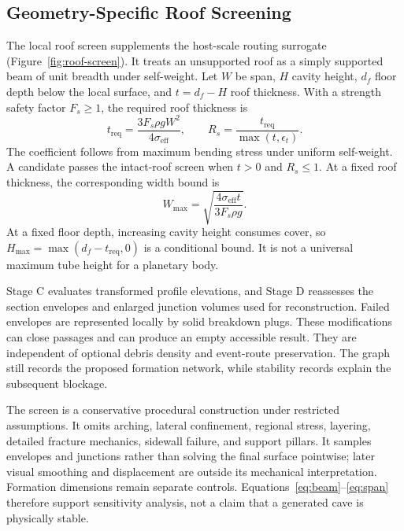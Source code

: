 \documentclass[conference]{IEEEtran}
\begin{document}
\subsection{Geometry-Specific Roof Screening}
\label{sec:roof}
The local roof screen supplements the host-scale routing surrogate (Figure~\ref{fig:roof-screen}). It treats an unsupported roof as a simply supported beam of unit breadth under self-weight. Let $W$ be span, $H$ cavity height, $d_f$ floor depth below the local surface, and $t=d_f-H$ roof thickness. With a strength safety factor $F_s\geq1$, the required roof thickness is
\begin{equation}
t_{\mathrm{req}}=\frac{3F_s\rho gW^2}{4\sigma_{\mathrm{eff}}},\qquad
R_s=\frac{t_{\mathrm{req}}}{\max(t,\epsilon_t)}.
\label{eq:beam}
\end{equation}
The coefficient follows from maximum bending stress under uniform self-weight. A candidate passes the intact-roof screen when $t>0$ and $R_s\leq1$. At a fixed roof thickness, the corresponding width bound is
\begin{equation}
W_{\max}=\sqrt{\frac{4\sigma_{\mathrm{eff}}t}{3F_s\rho g}}.
\label{eq:span}
\end{equation}
At a fixed floor depth, increasing cavity height consumes cover, so $H_{\max}=\max(d_f-t_{\mathrm{req}},0)$ is a conditional bound. It is not a universal maximum tube height for a planetary body.

Stage C evaluates transformed profile elevations, and Stage D reassesses the section envelopes and enlarged junction volumes used for reconstruction. Failed envelopes are represented locally by solid breakdown plugs. These modifications can close passages and can produce an empty accessible result. They are independent of optional debris density and event-route preservation. The graph still records the proposed formation network, while stability records explain the subsequent blockage.

The screen is a conservative procedural construction under restricted assumptions. It omits arching, lateral confinement, regional stress, layering, detailed fracture mechanics, sidewall failure, and support pillars. It samples envelopes and junctions rather than solving the final surface pointwise; later visual smoothing and displacement are outside its mechanical interpretation. Formation dimensions remain separate controls. Equations~\eqref{eq:beam}--\eqref{eq:span} therefore support sensitivity analysis, not a claim that a generated cave is physically stable.
\end{document}
